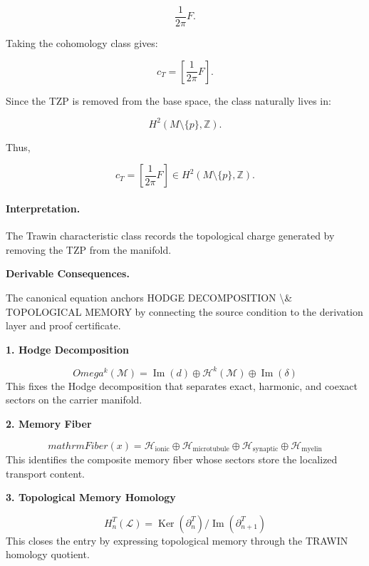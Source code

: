 \begin{equation}
\frac{1}{2\pi}F .
\end{equation}

Taking the cohomology class gives:

\begin{equation}
c_T
=
\left[
\frac{1}{2\pi}F
\right].
\end{equation}

Since the TZP is removed from the base space, the class naturally lives in:

\begin{equation}
H^2(M\setminus\{p\},\mathbb{Z}) .
\end{equation}

Thus,

\begin{equation}
\boxed{
c_T
=
\left[
\frac{1}{2\pi}F
\right]
\in
H^2(M\setminus\{p\},\mathbb{Z}) .
}
\end{equation}

\paragraph{Interpretation.}
The Trawin characteristic class records the topological charge generated by removing the TZP from the manifold.

\par\vspace{0.35em}
\noindent\textbf{Derivable Consequences.}\quad
\begingroup
\footnotesize
\raggedright
The canonical equation anchors HODGE DECOMPOSITION \textbackslash{}\& TOPOLOGICAL MEMORY by connecting the source condition to the derivation layer and proof certificate.
\par\endgroup

\noindent\textbf{1. Hodge Decomposition}\par
\[
Omega^k(\mathcal{M})=\operatorname{Im}(d)\oplus \mathcal{H}^k(\mathcal{M})\oplus \operatorname{Im}(\delta)
\]
\noindent This fixes the Hodge decomposition that separates exact, harmonic, and coexact sectors on the carrier manifold.\par
\noindent\textbf{2. Memory Fiber}\par
\[
mathrm{Fiber}(x)=\mathcal{H}_{\mathrm{ionic}}\oplus \mathcal{H}_{\mathrm{microtubule}}\oplus \mathcal{H}_{\mathrm{synaptic}}\oplus \mathcal{H}_{\mathrm{myelin}}
\]
\noindent This identifies the composite memory fiber whose sectors store the localized transport content.\par
\noindent\textbf{3. Topological Memory Homology}\par
\[
H_n^T(\mathcal{L})=\operatorname{Ker}(\partial_n^T)/\operatorname{Im}(\partial_{n+1}^T)
\]
\noindent This closes the entry by expressing topological memory through the TRAWIN homology quotient.\par

